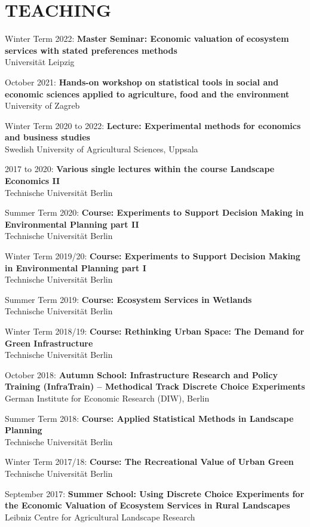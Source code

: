 \documentclass[paper=a4,fontsize=11pt]{scrartcl} %
\newcommand{\NewPart}[2]{\section*{\uppercase{#1} #2}}
\newcommand{\TalkEntry}[4]{
		\noindent #1, #2, #3 #4}
\newcommand{\CourseEntry}[3]{
		\noindent \item{#1: \textbf{#2} \\ #3}}
\begin{document}
\NewPart{Teaching}{}

\begin{etaremune}
\item[]
\vspace{-24pt}

\CourseEntry{Winter Term 2022}{Master Seminar: Economic valuation of ecosystem services with stated preferences methods}{Universität Leipzig}

\CourseEntry{October 2021}{Hands-on workshop on statistical tools in social and economic sciences applied to agriculture, food and the environment}{University of Zagreb}

\CourseEntry{Winter Term 2020 to 2022}{Lecture: Experimental methods for economics and business studies}{Swedish University of Agricultural Sciences, Uppsala}

\CourseEntry{2017 to 2020}{Various single lectures within the course Landscape Economics II}{Technische Universität Berlin}

\CourseEntry{Summer Term 2020}{Course: Experiments to Support Decision Making in Environmental Planning part II}{Technische Universität Berlin}

\CourseEntry{Winter Term 2019/20}{Course: Experiments to Support Decision Making in Environmental Planning part I}{Technische Universität Berlin}

\CourseEntry{Summer Term 2019}{Course: Ecosystem Services in Wetlands}{Technische Universität Berlin}

\CourseEntry{Winter Term 2018/19}{Course: Rethinking Urban Space: The Demand for Green Infrastructure}{Technische Universität Berlin}

\CourseEntry{October 2018}{Autumn School: Infrastructure Research and Policy Training (InfraTrain) -- Methodical Track Discrete Choice Experiments}{German Institute for Economic Research (DIW), Berlin}

\CourseEntry{Summer Term 2018}{Course: Applied Statistical Methods in Landscape Planning}{Technische Universität Berlin}

\CourseEntry{Winter Term 2017/18}{Course: The Recreational Value of Urban Green}{Technische Universität Berlin}

\CourseEntry{September 2017}{Summer School: Using Discrete Choice Experiments for the Economic Valuation of Ecosystem Services in Rural Landscapes}{Leibniz Centre for Agricultural Landscape Research}


\end{etaremune}
\end{document}
